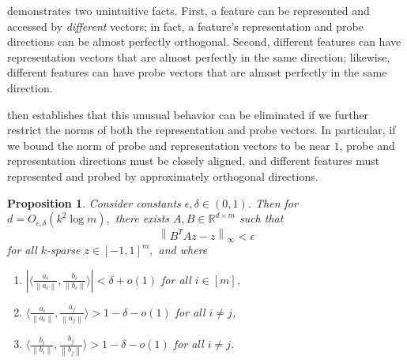 \documentclass[11pt]{article}
\newtheorem{proposition}[theorem]{Proposition}
\newcommand{\RR}{\mathbb{R}}
\newcommand{\norm}[1]{\left\|#1\right\|}
\begin{document}
 demonstrates two unintuitive facts. First, a feature can be represented and accessed by \textit{different} vectors; in fact, a feature's representation and probe directions can be almost perfectly orthogonal. Second, different features can have representation vectors that are almost perfectly in the same direction; likewise, different features can have probe vectors that are almost perfectly in the same direction.

 then establishes that this unusual behavior can be eliminated if we further restrict the norms of both the representation and probe vectors. In particular, if we bound the norm of probe and representation vectors to be near $1$, probe and representation directions must be closely aligned, and different features must represented and probed by approximately orthogonal directions.

\begin{proposition}\label{prop:geometry-1}
    Consider constants $\epsilon, \delta\in (0,1)$. Then for $d = O_{\epsilon,\delta}(k^2\log m),$ there exists $A,B\in \RR^{d\times m}$ such that
    \begin{equation}
        \norm{B^TAz - z}_\infty < \epsilon
    \end{equation}
    for all $k$-sparse $z\in [-1,1]^m,$ and where
    \begin{enumerate}
        \item[(i)] $|\langle \frac{a_i}{\norm{a_i}}, \frac{b_i}{\norm{b_i}}\rangle| < \delta + o(1)$ for all $i\in [m]$,
        \item[(ii)] $\langle \frac{a_i}{\norm{a_i}}, \frac{a_j}{\norm{a_j}}\rangle
        > 1 - \delta - o(1)$ for all $i\neq j$,
        \item[(iii)] $\langle \frac{b_i}{\norm{b_i}}, \frac{b_j}{\norm{b_j}}\rangle > 1 - \delta - o(1)$ for all $i\neq j$.
    \end{enumerate}
\end{proposition}
\end{document}
